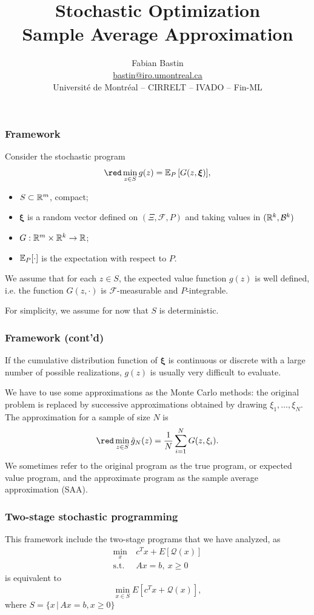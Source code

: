 \documentclass{beamer}
\title[SAA]{Stochastic Optimization\\Sample Average Approximation}
\author[Fabian Bastin]{Fabian Bastin \\ \url{bastin@iro.umontreal.ca} \\ Université de Montréal -- CIRRELT -- IVADO -- Fin-ML}
\date{}
\def\bxi{\boldsymbol\xi}
\def\cQ{\mathcal{Q}}
\begin{document}
\frame{\titlepage}

\begin{frame}
\frametitle{Framework}

Consider the stochastic program
\[
{\red \min_{z \in S} g(z) = \EE_P \left[ G(z, \bxi) \right]},
\]
\vspace{-0.5cm}
\begin{itemize}
\item 
$S \subset \mathbb{R}^m$, compact;
\item
$\bxi$ is a random vector defined on $( \Xi, \mathcal{F}, P )$ and taking values in $( \mathbb{R}^k, \mathcal{B}^k )$ %
\item
$G: \mathbb{R}^m \times \mathbb{R}^k \rightarrow \mathbb{R}$;
\item
${\mathbb{E}}_P[\cdot]$ is the expectation with respect to $P$.
\end{itemize}

We assume that for each $z \in S$, the expected value function $g(z)$ is well defined, i.e. the function $G(z,\cdot)$ is $\mathcal{F}$-measurable and $P$-integrable.

\mbox{}

For simplicity, we assume for now that {\blue $S$ is deterministic}.

\end{frame}

\begin{frame}
\frametitle{Framework (cont'd)}

If the cumulative distribution function of $\bxi$ is continuous or discrete with a large number of possible realizations, $g(z)$ is usually very difficult to evaluate.

\mbox{}

We have to use some approximations as the Monte Carlo methods: the original problem is replaced by successive approximations obtained by drawing $\xi_1,\ldots{}, \xi_N$.
The approximation for a sample of size $N$ is
\[
{\red \min_{z \in S} \hat{g}_N(z) = \frac{1}{N} \sum_{i = 1}^N
  G(z, \xi_i)}.
\]
We sometimes refer to the original program as the {\blue true program}, or {\blue expected value program}, and the approximate program as the {\blue sample average approximation (SAA)}.

\end{frame}

\begin{frame}
\frametitle{Two-stage stochastic programming}

This framework include the two-stage programs that we have analyzed, as
\begin{align*}
\min_x\ & c^Tx + E[\cQ(x)] \\
\mbox{s.t. } & Ax = b,\ x \geq 0
\end{align*}
is equivalent to
$$
\min_{x \in S} E[c^Tx + \cQ(x)],
$$
where $S = \{ x \,|\, Ax = b, x \geq 0 \}$

\end{frame}
\end{document}
